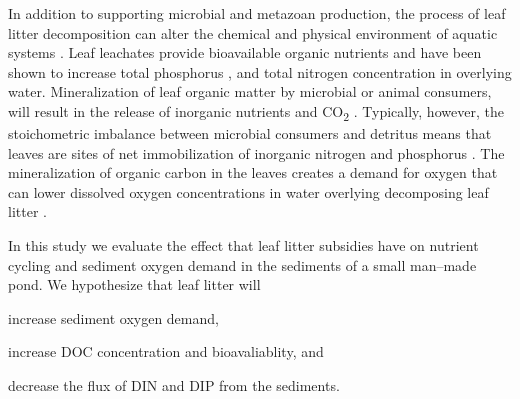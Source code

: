 In addition to supporting microbial and metazoan production, the process of leaf litter decomposition can alter the chemical and physical environment of aquatic systems \cite{Gessner_1999}. Leaf leachates provide bioavailable organic nutrients \cite{McConnell_1968,Duan_2014} and have been shown to increase total phosphorus \cite{Feh_2015b}, and total nitrogen \cite{Feh_2015} concentration in overlying water. Mineralization of leaf organic matter by microbial or animal consumers, will result in the release of inorganic nutrients and CO\textsubscript{2} \cite{CITE}. Typically, however, the stoichometric imbalance between microbial consumers and detritus means that leaves are sites of net immobilization of inorganic nitrogen and phosphorus \cite{CITE}. The mineralization of organic carbon in the leaves creates a demand for oxygen \cite{CITE} that can lower dissolved oxygen concentrations in water overlying decomposing leaf litter \cite{Hodkinson_1975,Rubbo_2008,Mehring_2014,Feh_2015b}.

In this study we evaluate the effect that leaf litter subsidies have on nutrient cycling and sediment oxygen demand in the sediments of a small man--made pond. We hypothesize that leaf litter will \begin{enumerate*} \item increase sediment oxygen demand, \item increase DOC concentration and bioavaliablity, and \item decrease the flux of DIN and DIP from the sediments. \end{enumerate*}